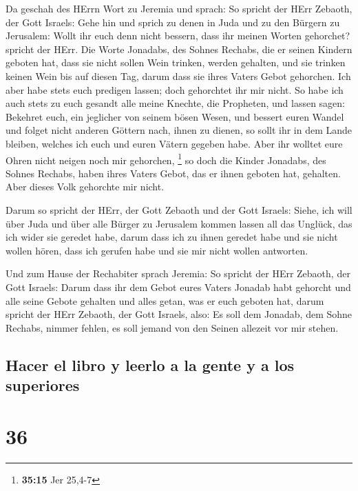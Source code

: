  Da geschah des HErrn Wort zu Jeremia und sprach:
 So spricht der HErr Zebaoth, der Gott Israels: Gehe hin
und sprich zu denen in Juda und zu den Bürgern zu Jerusalem: Wollt ihr
euch denn nicht bessern, dass ihr meinen Worten gehorchet? spricht der
HErr.  Die Worte Jonadabs, des Sohnes Rechabs, die er
seinen Kindern geboten hat, dass sie nicht sollen Wein trinken, werden
gehalten, und sie trinken keinen Wein bis auf diesen Tag, darum dass sie
ihres Vaters Gebot gehorchen. Ich aber habe stets euch predigen lassen;
doch gehorchtet ihr mir nicht.  So habe ich auch stets zu
euch gesandt alle meine Knechte, die Propheten, und lassen sagen:
Bekehret euch, ein jeglicher von seinem bösen Wesen, und bessert euren
Wandel und folget nicht anderen Göttern nach, ihnen zu dienen, so sollt
ihr in dem Lande bleiben, welches ich euch und euren Vätern gegeben
habe. Aber ihr wolltet eure Ohren nicht neigen noch mir gehorchen,
\footnote{\textbf{35:15} Jer 25,4-7}  so doch die Kinder
Jonadabs, des Sohnes Rechabs, haben ihres Vaters Gebot, das er ihnen
geboten hat, gehalten. Aber dieses Volk gehorchte mir nicht.

 Darum so spricht der HErr, der Gott Zebaoth und der Gott
Israels: Siehe, ich will über Juda und über alle Bürger zu Jerusalem
kommen lassen all das Unglück, das ich wider sie geredet habe, darum
dass ich zu ihnen geredet habe und sie nicht wollen hören, dass ich
gerufen habe und sie mir nicht wollen antworten.

 Und zum Hause der Rechabiter sprach Jeremia: So spricht
der HErr Zebaoth, der Gott Israels: Darum dass ihr dem Gebot eures
Vaters Jonadab habt gehorcht und alle seine Gebote gehalten und alles
getan, was er euch geboten hat,  darum spricht der HErr
Zebaoth, der Gott Israels, also: Es soll dem Jonadab, dem Sohne Rechabs,
nimmer fehlen, es soll jemand von den Seinen allezeit vor mir stehen.

\hypertarget{hacer-el-libro-y-leerlo-a-la-gente-y-a-los-superiores}{%
\subsection{Hacer el libro y leerlo a la gente y a los
superiores}\label{hacer-el-libro-y-leerlo-a-la-gente-y-a-los-superiores}}

\hypertarget{section-35}{%
\section{36}\label{section-35}}

